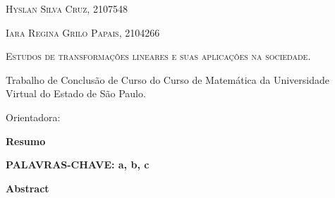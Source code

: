 \documentclass[12pt, a4paper,
 chapter=TITLE,
  section=TITLE,
   subsection=TITLE,
    subsubsection=TITLE]{abntex2}
\begin{document}
	
\begin{center}
	{\ABNTEXchapterfont\large\textsc{\imprimirinstituicao}}
	\vspace*{\fill}
	
	{\ABNTEXchapterfont\bfseries\Large\imprimirtitulo}
	\vspace*{\fill}
	
	
	\vspace*{\fill}
	
	{\ABNTEXchapterfont\large\textsc{Hyslan Silva Cruz, 2107548}}
	
	{\ABNTEXchapterfont\large\textsc{Iara Regina Grilo Papais, 2104266}}
	
	\vspace*{\fill}
	
	{\ABNTEXchapterfont\large\textsc{Estudos de transformações lineares e suas aplicações na sociedade.}}
	
	\vspace*{\fill}
	
	\begin{flushright}
		\begin{minipage}{0.5\textwidth}
			Trabalho de Conclusão de Curso do Curso de Matemática da Universidade Virtual do Estado de São Paulo.
			
			Orientadora: \imprimirorientador
		\end{minipage}
	\end{flushright}
	
	\vspace*{\fill}
	
	{\ABNTEXchapterfont\large\textsc{\imprimirlocal}}
	
	{\ABNTEXchapterfont\large\textsc{\imprimirdata}}
	
\end{center}
	
	\newpage
	
	\begin{center}
		\textbf{Resumo}
		
		\vspace{0.5cm}
		
		\lipsum[1]
		
		
	\end{center}
	
	\vspace{0.5cm}
	
	\textbf{PALAVRAS-CHAVE: a, b, c}
	
	\newpage
	
	\begin{center}
		\textbf{Abstract}
		
		\vspace{1cm}
		
		\lipsum[1]
		
	\end{center}
	
\end{document}

